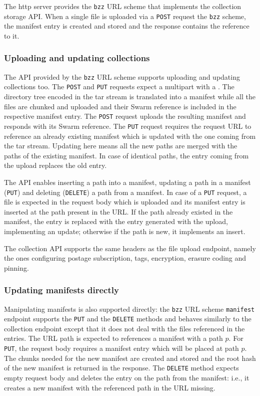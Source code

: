 The http server provides the \lstinline{bzz} URL scheme that implements the collection storage API. When a single file is uploaded via a \lstinline{POST} request the \lstinline{bzz} scheme, the manifest entry is created and stored and the response contains the reference to it.

\subsubsection{Uploading and updating collections}

The API provided by the \lstinline{bzz} URL scheme supports uploading and updating collections too. The \lstinline{POST} and \lstinline{PUT} requests expect a multipart with a . The directory tree encoded in the tar stream is translated into a manifest while all the files are chunked and uploaded and their Swarm reference is included in the respective manifest entry. The \lstinline{POST} request uploads the resulting manifest and responds with its Swarm reference. The \lstinline{PUT} request requires the request URL to reference an already existing manifest which is updated with the one coming from the tar stream. Updating here means all the new paths are merged with the paths of the existing manifest. In case of identical paths, the entry coming from the upload replaces the old entry.

The API enables inserting a path into a manifest, updating a path in a manifest (\lstinline{PUT}) and deleting (\lstinline{DELETE}) a path from a manifest. In case of a \lstinline{PUT} request, a file is expected in the request body which is uploaded and its manifest entry is inserted at the path present in the URL. If the path already existed in the manifest, the entry is replaced with the entry generated with the upload, implementing an update; otherwise if the path is new, it implements an insert. 

The collection API supports the same headers as the file upload endpoint, namely the ones configuring postage subscription, tags, encryption, erasure coding and pinning.

\subsubsection{Updating manifests directly}

Manipulating manifests is also supported directly: the \lstinline{bzz} URL scheme \lstinline{manifest} endpoint supports the \lstinline{PUT} and the \lstinline{DELETE} methods and behaves similarly to the collection endpoint except that it does not deal with the files referenced in the entries. The  URL path is expected to references a manifest with a path $p$. For \lstinline{PUT}, the request body requires a manifest entry which will be placed at path $p$. The chunks needed for the new manifest are created and stored and the root  hash of the  new manifest is returned in the response. The  \lstinline{DELETE} method expects empty request body  and deletes the entry on the path from the manifest: i.e., it creates a new manifest with the referenced path in  the URL missing. 

